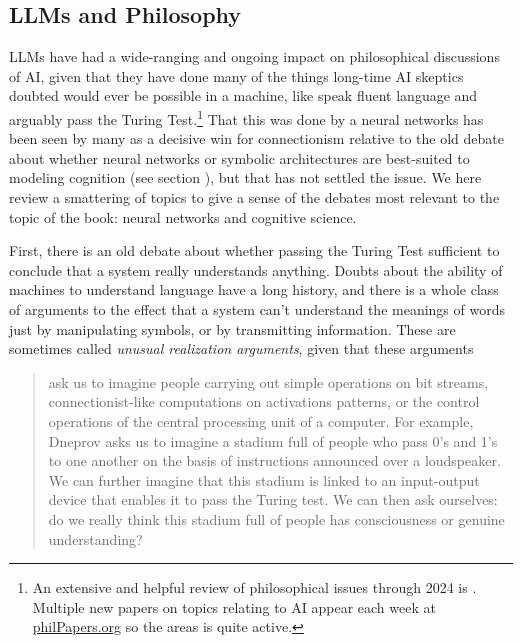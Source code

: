 \subsection{LLMs and Philosophy}\label{llmPhilosophy}

LLMs have had a wide-ranging and ongoing impact on philosophical discussions of AI, given that they have done many of the things long-time AI skeptics doubted would ever be possible in a machine, like speak fluent language and arguably pass the Turing Test.\footnote{An extensive and helpful review of philosophical issues through 2024 is \cite{milliere2024philosophical1, milliere2024philosophical2}. Multiple new papers on topics relating to AI appear each week at \url{philPapers.org} so the areas is quite active.} That this was done by a neural networks has been seen by many as a decisive win for connectionism relative to the old debate about whether neural networks or symbolic architectures are best-suited to modeling cognition (see section ), but that has not settled the issue. We here review  a smattering of topics to give a sense of the debates most relevant to the topic of the book: neural networks and cognitive science.  


First, there is an old debate about whether passing the Turing Test sufficient to conclude that a system really understands anything. Doubts about the ability of machines to understand language have a long history, and there is a whole class of arguments to the effect that a system can’t understand the meanings of words just by manipulating symbols, or by transmitting information. These are sometimes called \emph{unusual realization arguments}, given that these arguments
\begin{quote}
ask us to imagine people carrying out simple operations on bit streams, connectionist-like computations on activations patterns, or the control operations of the central processing unit of a computer. For example, Dneprov asks us to imagine a stadium full of people who pass 0’s and 1’s to one another on the basis of instructions announced over a loudspeaker. We can further imagine that this stadium is linked to an input-output device that enables it to pass the Turing test. We can then ask ourselves: do we really think this stadium full of people has consciousness or genuine understanding? \cite{noelle2022artificial}
\end{quote}

